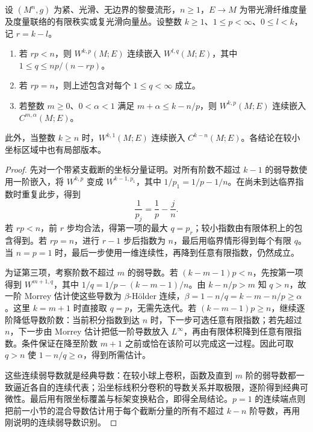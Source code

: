 \begin{corollary}\label{g3:cor:higher-sobolev-embedding}
	设 \((M^n,g)\) 为紧、光滑、无边界的黎曼流形，\(n\ge1\)，\(E\to M\) 为带光滑纤维度量及度量联络的有限秩实或复光滑向量丛。设整数 \(k\ge1\)、\(1\le p<\infty\)、\(0\le l<k\)，记 \(r=k-l\)。
	\begin{enumerate}
		\item 若 \(rp<n\)，则 \(W^{k,p}(M;E)\) 连续嵌入 \(W^{l,q}(M;E)\)，其中 \(1\le q\le np/(n-rp)\)。
		\item 若 \(rp=n\)，则上述包含对每个 \(1\le q<\infty\) 成立。
		\item 若整数 \(m\ge0\)、\(0<\alpha<1\) 满足 \(m+\alpha\le k-n/p\)，则 \(W^{k,p}(M;E)\) 连续嵌入 \(C^{m,\alpha}(M;E)\)。
	\end{enumerate}
	此外，当整数 \(k\ge n\) 时，\(W^{k,1}(M;E)\) 连续嵌入 \(C^{k-n}(M;E)\)。各结论在较小坐标区域中也有局部版本。
\end{corollary}
\begin{proof}
	先对一个带紧支截断的坐标分量证明。对所有阶数不超过 \(k-1\) 的弱导数使用一阶嵌入，将 \(W^{k,p}\) 变成 \(W^{k-1,p_1}\)，其中 \(1/p_1=1/p-1/n\)。在尚未到达临界指数时重复此步，得到
	\[
		\frac1{p_j}=\frac1p-\frac jn.
	\]
	若 \(rp<n\)，前 \(r\) 步均合法，得第一项的最大 \(q=p_r\)；较小指数由有限体积上的包含得到。若 \(rp=n\)，进行 \(r-1\) 步后指数为 \(n\)，最后用临界情形得到每个有限 \(q\)。当 \(n=p=1\) 时，最后一步使用一维连续性，再降到任意有限指数，仍然成立。

	为证第三项，考察阶数不超过 \(m\) 的弱导数。若 \((k-m-1)p<n\)，先按第一项得到 \(W^{m+1,q}\)，其中
	\(1/q=1/p-(k-m-1)/n\)。由 \(k-n/p>m\) 知 \(q>n\)，故一阶 Morrey 估计使这些导数为 \(\beta\)-Hölder 连续，\(\beta=1-n/q=k-m-n/p\ge\alpha\)。这里 \(k=m+1\) 时直接取 \(q=p\)，无需先迭代。若 \((k-m-1)p\ge n\)，继续逐阶降低导数阶数：当前积分指数到达 \(n\) 时，下一步可选任意有限指数；若先超过 \(n\)，下一步由 Morrey 估计把低一阶导数放入 \(L^\infty\)，再由有限体积降到任意有限指数。条件保证在降至阶数 \(m+1\) 之前或恰在该阶可以完成这一过程。因此可取 \(q>n\) 使 \(1-n/q\ge\alpha\)，得到所需估计。

	这些连续弱导数就是经典导数：在较小球上卷积，函数及直到 \(m\) 阶的弱导数都一致逼近各自的连续代表；沿坐标线积分卷积的导数关系并取极限，逐阶得到经典可微性。最后用有限坐标覆盖与标架变换粘合，即得全局结论。\(p=1\) 的连续端点则把前一小节的混合导数估计用于每个截断分量的所有不超过 \(k-n\) 阶导数，再用刚说明的连续弱导数识别。
\end{proof}

